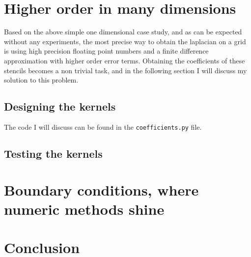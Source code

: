 \documentclass[pdftex,12pt,a4paper]{article}
\begin{document}
	\section{Higher order in many dimensions}
		Based on the above simple one dimensional case study, and as can be expected without any experiments, the most precise way to obtain the laplacian on a grid is using high precision floating point numbers and a finite difference approximation with higher order error terms. Obtaining the coefficients of these stencils becomes a non trivial task, and in the following section I will discuss my solution to this problem.
	\subsection{Designing the kernels}
		The code I will discuss can be found in the \texttt{coefficients.py} file. 
	\subsection{Testing the kernels}
		
	\section{Boundary conditions, where numeric methods shine}
		
	\section{Conclusion}
		
	
    
\end{document}
